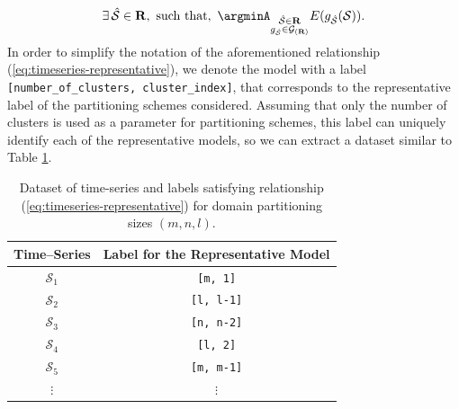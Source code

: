 \begin{equation}\label{eq:timeseries-representative}
\exists\, \mathcal{\hat{S}} \in \mathbf{R}, \,\, \textrm{such that}, \,\, \argminA_{\substack{\mathcal{\hat{S}} \in \mathbf{R}\\g_{\mathcal{\hat{S}}} \in \mathcal{G}_{(\mathbf{R})}}} E (g_{\mathcal{\hat{S}}}(\mathcal{S})).
\end{equation}
In order to simplify the notation of the aforementioned relationship (\ref{eq:timeseries-representative}), we denote the model with a label \texttt{[number\_of\_clusters, cluster\_index]}, that corresponds to the representative label of the partitioning schemes considered. Assuming that only the number of clusters is used as a parameter for partitioning schemes, this label can uniquely identify each of the representative models, so we can extract a dataset similar to Table \ref{Tab:TSClassificationDataset}. %
\begin{table}[h]
	\centering
	\begin{tabular}{|c|c|}
		\hline
		Time--Series   & Label for the Representative Model\\ \hline
		$\mathcal{S}_{1}$  & \texttt{[m, 1]} \\ \hline
		$\mathcal{S}_{2}$ & \texttt{[l, l-1]} \\ \hline
		$\mathcal{S}_{3}$ & \texttt{[n, n-2]} \\ \hline
		$\mathcal{S}_{4}$ & \texttt{[l, 2]} \\ \hline
		$\mathcal{S}_{5}$ & \texttt{[m, m-1]} \\ \hline
		$\vdots$       & $\vdots$ \\ \hline
	\end{tabular}
	\caption{Dataset of time-series and labels satisfying relationship (\ref{eq:timeseries-representative}) for domain partitioning sizes $(m,n,l)$.}
	\label{Tab:TSClassificationDataset}
\end{table}

